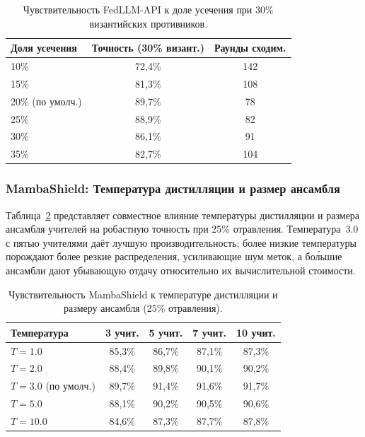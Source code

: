 \begin{table}[htbp]
\centering
\caption{Чувствительность FedLLM-API к доле усечения при 30\% византийских противников.}
\label{tab:app_sens_trim}
\begin{tabular}{lcc}
\toprule
Доля усечения & Точность (30\% визант.) & Раунды сходим. \\
\midrule
10\% & 72,4\% & 142 \\
15\% & 81,3\% & 108 \\
20\% (по умолч.) & 89,7\% & 78 \\
25\% & 88,9\% & 82 \\
30\% & 86,1\% & 91 \\
35\% & 82,7\% & 104 \\
\bottomrule
\end{tabular}
\end{table}


\subsubsection{MambaShield: Температура дистилляции и размер ансамбля}

Таблица~\ref{tab:app_sens_mamba} представляет совместное влияние температуры дистилляции и размера ансамбля учителей на робастную точность при 25\% отравления. Температура~3.0 с пятью учителями даёт лучшую производительность; более низкие температуры порождают более резкие распределения, усиливающие шум меток, а бо\'{л}ьшие ансамбли дают убывающую отдачу относительно их вычислительной стоимости.

\begin{table}[htbp]
\centering
\caption{Чувствительность MambaShield к температуре дистилляции и размеру ансамбля (25\% отравления).}
\label{tab:app_sens_mamba}
\begin{tabular}{lcccc}
\toprule
Температура & 3 учит. & 5 учит. & 7 учит. & 10 учит. \\
\midrule
$T=1.0$ & 85,3\% & 86,7\% & 87,1\% & 87,3\% \\
$T=2.0$ & 88,4\% & 89,8\% & 90,1\% & 90,2\% \\
$T=3.0$ (по умолч.) & 89,7\% & 91,4\% & 91,6\% & 91,7\% \\
$T=5.0$ & 88,1\% & 90,2\% & 90,5\% & 90,6\% \\
$T=10.0$ & 84,6\% & 87,3\% & 87,7\% & 87,8\% \\
\bottomrule
\end{tabular}
\end{table}



